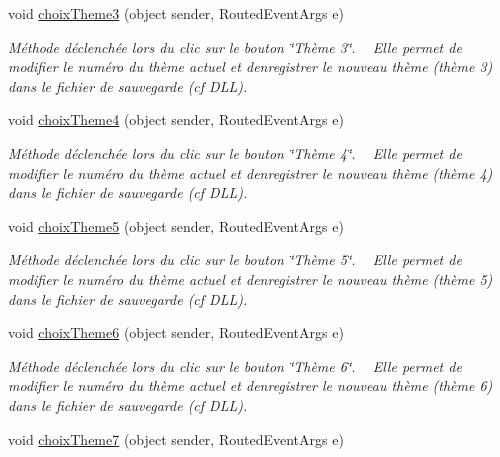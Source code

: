 \begin{DoxyCompactItemize}
void \hyperlink{class_my_domotik_1_1_reglages_couleur_a99bc9d2295875ab2761a4b130f2ebd7b}{choix\+Theme3} (object sender, Routed\+Event\+Args e)
\begin{DoxyCompactList}\small\item\em Méthode déclenchée lors du clic sur le bouton \char`\"{}\+Thème 3\char`\"{}. ~\newline
Elle permet de modifier le numéro du thème actuel et d\textquotesingle{}enregistrer le nouveau thème (thème 3) dans le fichier de sauvegarde (cf D\+LL). \end{DoxyCompactList}\item 
void \hyperlink{class_my_domotik_1_1_reglages_couleur_afa133643c69b92a36248d772e6e0e043}{choix\+Theme4} (object sender, Routed\+Event\+Args e)
\begin{DoxyCompactList}\small\item\em Méthode déclenchée lors du clic sur le bouton \char`\"{}\+Thème 4\char`\"{}. ~\newline
Elle permet de modifier le numéro du thème actuel et d\textquotesingle{}enregistrer le nouveau thème (thème 4) dans le fichier de sauvegarde (cf D\+LL). \end{DoxyCompactList}\item 
void \hyperlink{class_my_domotik_1_1_reglages_couleur_a59ba5a965a09f553c5ae116e128895eb}{choix\+Theme5} (object sender, Routed\+Event\+Args e)
\begin{DoxyCompactList}\small\item\em Méthode déclenchée lors du clic sur le bouton \char`\"{}\+Thème 5\char`\"{}. ~\newline
Elle permet de modifier le numéro du thème actuel et d\textquotesingle{}enregistrer le nouveau thème (thème 5) dans le fichier de sauvegarde (cf D\+LL). \end{DoxyCompactList}\item 
void \hyperlink{class_my_domotik_1_1_reglages_couleur_aab471950cc4f665d80de115fc17eeab3}{choix\+Theme6} (object sender, Routed\+Event\+Args e)
\begin{DoxyCompactList}\small\item\em Méthode déclenchée lors du clic sur le bouton \char`\"{}\+Thème 6\char`\"{}. ~\newline
Elle permet de modifier le numéro du thème actuel et d\textquotesingle{}enregistrer le nouveau thème (thème 6) dans le fichier de sauvegarde (cf D\+LL). \end{DoxyCompactList}\item 
void \hyperlink{class_my_domotik_1_1_reglages_couleur_a3b0d2b3eaa6995b38916fb12f0f3b92b}{choix\+Theme7} (object sender, Routed\+Event\+Args e)

\end{DoxyCompactItemize}
